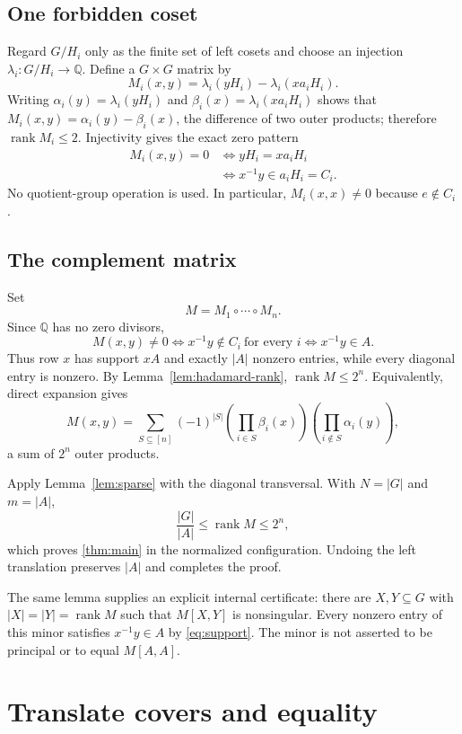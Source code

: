 \documentclass[11pt,a4paper]{amsart}
\theoremstyle{definition}
\theoremstyle{remark}
\newcommand{\rank}{\operatorname{rank}}
\newcommand{\Had}{\mathbin{\circ}}
\newcommand{\Q}{\mathbb{Q}}
\begin{document}
\subsection{One forbidden coset}
Regard $G/H_i$ only as the finite set of left cosets and choose an injection
$\lambda_i:G/H_i\to\Q$.  Define a $G\times G$ matrix by
\[
  M_i(x,y)=\lambda_i(yH_i)-\lambda_i(xa_iH_i).
\]
Writing $\alpha_i(y)=\lambda_i(yH_i)$ and
$\beta_i(x)=\lambda_i(xa_iH_i)$ shows that
$M_i(x,y)=\alpha_i(y)-\beta_i(x)$, the difference of two outer products;
therefore $\rank M_i\le2$.  Injectivity gives the exact zero pattern
\[
\begin{aligned}
 M_i(x,y)=0
 &\Longleftrightarrow yH_i=xa_iH_i\\
 &\Longleftrightarrow x^{-1}y\in a_iH_i=C_i.
\end{aligned}
\]
No quotient-group operation is used.  In particular, $M_i(x,x)\ne0$ because
$e\notin C_i$.

\subsection{The complement matrix}
Set
\[
  M=M_1\Had\cdots\Had M_n.
\]
Since $\Q$ has no zero divisors,
\[
  M(x,y)\ne0
  \Longleftrightarrow x^{-1}y\notin C_i\ \text{for every }i
  \Longleftrightarrow x^{-1}y\in A.                 \tag{3.1}\label{eq:support}
\]
Thus row $x$ has support $xA$ and exactly $|A|$ nonzero entries, while every
diagonal entry is nonzero.  By Lemma~\ref{lem:hadamard-rank},
$\rank M\le2^n$.  Equivalently, direct expansion gives
\[
 M(x,y)=\sum_{S\subseteq[n]}(-1)^{|S|}
 \left(\prod_{i\in S}\beta_i(x)\right)
 \left(\prod_{i\notin S}\alpha_i(y)\right),       \tag{3.2}\label{eq:expansion}
\]
a sum of $2^n$ outer products.

Apply Lemma~\ref{lem:sparse} with the diagonal transversal.  With $N=|G|$ and
$m=|A|$,
\[
  \frac{|G|}{|A|}\le\rank M\le2^n,
\]
which proves \cref{thm:main} in the normalized configuration.  Undoing the
left translation preserves $|A|$ and completes the proof.

The same lemma supplies an explicit internal certificate: there are
$X,Y\subseteq G$ with $|X|=|Y|=\rank M$ such that $M[X,Y]$ is nonsingular.
Every nonzero entry of this minor satisfies $x^{-1}y\in A$ by
\cref{eq:support}.  The minor is not asserted to be principal or to equal
$M[A,A]$.

\section{Translate covers and equality}
\end{document}

